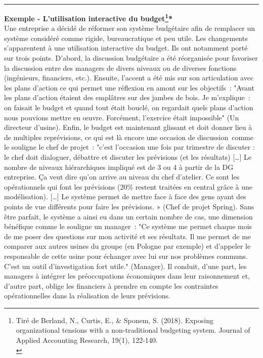 \documentclass{tufte-handout}
\begin{document}
\begin{enumerate}
\noindent\rule{\textwidth}{0.5pt}
\textbf{Exemple - L'utilisation interactive du budget\footnote{Tiré de Berland, N., Curtis, E., \& Sponem, S. (2018). Exposing organizational tensions with a non-traditional budgeting system. Journal of Applied Accounting Research, 19(1), 122‑140.\\}*}\\
Une entreprise a décidé de réformer son système budgétaire afin de remplacer un système considéré comme rigide, bureaucratique et peu utile. Les changements s'apparentent à une utilisation interactive du budget. Ils ont notamment porté sur trois points. D'abord, la discussion budgétaire a été réorganisée pour favoriser la discussion entre des managers de divers niveaux ou de diverses fonctions (ingénieurs, financiers, etc.). Ensuite, l'accent a été mis sur son articulation avec les plans d'action ce qui permet une réflexion en amont sur les objectifs : "Avant les plans d'action étaient des emplâtres sur des jambes de bois. Je m'explique : on faisait le budget et quand tout était bouclé, on regardait quels plans d'action nous pouvions mettre en œuvre. Forcément, l'exercice était impossible" (Un directeur d'usine). Enfin, le budget est maintenant glissant et doit donner lieu à de multiples reprévisions, ce qui est là encore une occasion de discussion comme le souligne le chef de projet : "c'est l'occasion une fois par trimestre de discuter : le chef doit dialoguer, débattre et discuter les prévisions (et les résultats) [\ldots{}] Le nombre de niveaux hiérarchiques impliqué est de 3 ou 4 à partir de la DG entreprise. Ça veut dire qu'on arrive au niveau du chef d'atelier. Ce sont les opérationnels qui font les prévisions (20\% restent traitées en central grâce à une modélisation). [\ldots{}] Le système permet de mettre face à face des gens ayant des points de vue différents pour faire les prévisions. » (Chef de projet Spring). Sans être parfait, le système a ainsi eu dans un certain nombre de cas, une dimension bénéfique comme le souligne un manager : "Ce système me permet chaque mois de me poser des questions sur mon activité et ses résultats. Il me permet de me comparer aux autres usines du groupe (en Pologne par exemple) et d'appeler le responsable de cette usine pour échanger avec lui sur nos problèmes communs. C'est un outil d'investigation fort utile." (Manager). Il conduit, d'une part, les managers à intégrer les préoccupations économiques dans leur raisonnement et, d'autre part, oblige les financiers à prendre en compte les contraintes opérationnelles dans la réalisation de leurs prévisions.\\


\end{enumerate}
\end{document}
